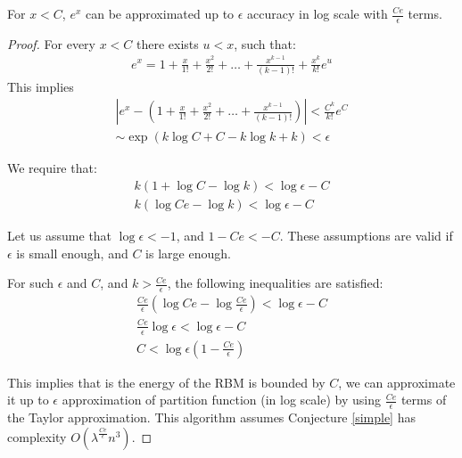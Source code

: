 \begin{lemma}
	For $x < C$, $e^x$ can be approximated up to $\epsilon$ accuracy in log scale with $\frac{Ce}{\epsilon}$ terms. 
\end{lemma}
\begin{proof}

For every $x < C$ there exists $u < x$, such that:  
\begin{align*}
	e^x = 1 + \frac{x}{1!} + \frac{x^2}{2!} + \dots + \frac{x^{k - 1}}{(k - 1)!} + \frac{x^k}{k!}e^u
\end{align*}
This implies
\begin{align*}
	|e^x - (1 + \frac{x}{1!} + \frac{x^2}{2!} + \dots + \frac{x^{k - 1}}{(k - 1)!}) | < \frac{C^k}{k!}e^C \\
	\sim \exp(k\log{C} + C - k\log{k} + k) < \epsilon
\end{align*}

We require that: 
\begin{align*}
	k (1 + \log{C} - \log{k}) < \log{\epsilon} - C \\ 
	k (\log{Ce} - \log{k}) < \log{\epsilon} - C
\end{align*}

Let us assume that $\log{\epsilon} < -1$, and $1 - Ce < -C$. These assumptions are valid if $\epsilon$ is small
enough, and $C$ is large enough.


For such $\epsilon$ and $C$, and $k > \frac{Ce}{\epsilon}$, the
following inequalities are satisfied:
\begin{align*}
	\frac{Ce}{\epsilon} (\log{Ce} - \log{\frac{Ce}{\epsilon}}) < \log{\epsilon} - C \\
	\frac{Ce}{\epsilon} \log{\epsilon} < \log{\epsilon} - C\\
	C < \log{\epsilon}(1 - \frac{Ce}{\epsilon})
\end{align*}

This implies that is the energy of the RBM is bounded by $C$, we can
approximate it up to $\epsilon$ approximation of partition function
(in log scale) by using $\frac{Ce}{\epsilon}$ terms of the Taylor
approximation. This algorithm assumes Conjecture \ref{simple} has
complexity $O(\lambda^{\frac{Ce}{\epsilon}}n^3)$.

\end{proof}



